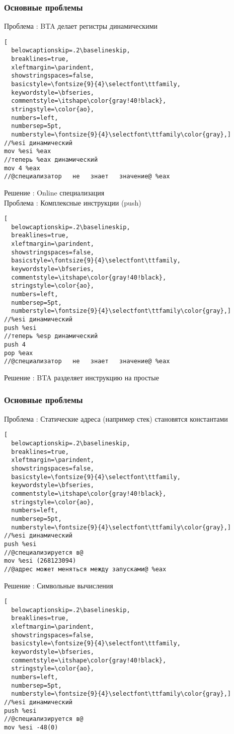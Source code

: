 \documentclass[demo]{beamer}
\begin{document}
\lstset{language=C}
\begin{frame}[fragile]\frametitle{Основные проблемы}
Проблема : BTA делает регистры динамическими \\
\begin{lstlisting}[
  belowcaptionskip=.2\baselineskip,
  breaklines=true,
  xleftmargin=\parindent,
  showstringspaces=false,
  basicstyle=\fontsize{9}{4}\selectfont\ttfamily,
  keywordstyle=\bfseries,
  commentstyle=\itshape\color{gray!40!black},
  stringstyle=\color{ao},
  numbers=left,
  numbersep=5pt,
  numberstyle=\fontsize{9}{4}\selectfont\ttfamily\color{gray},]
//%esi динамический
mov %esi %eax
//теперь %eax динамический
mov 4 %eax
//@специализатор   не   знает   значение@ %eax
\end{lstlisting}
Решение : Online специализация \\
\vfill
Проблема : Комплексные инструкции (push)\\\begin{lstlisting}[
  belowcaptionskip=.2\baselineskip,
  breaklines=true,
  xleftmargin=\parindent,
  showstringspaces=false,
  basicstyle=\fontsize{9}{4}\selectfont\ttfamily,
  keywordstyle=\bfseries,
  commentstyle=\itshape\color{gray!40!black},
  stringstyle=\color{ao},
  numbers=left,
  numbersep=5pt,
  numberstyle=\fontsize{9}{4}\selectfont\ttfamily\color{gray},]
//%esi динамический
push %esi
//теперь %esp динамический
push 4
pop %eax
//@специализатор   не   знает   значение@ %eax
\end{lstlisting}
Решение : BTA разделяет инструкцию на простые\\
\end{frame}


\lstset{language=C}
\begin{frame}[fragile]\frametitle{Основные проблемы}
Проблема : Статические адреса (например стек) становятся константами \\
\begin{lstlisting}[
  belowcaptionskip=.2\baselineskip,
  breaklines=true,
  xleftmargin=\parindent,
  showstringspaces=false,
  basicstyle=\fontsize{9}{4}\selectfont\ttfamily,
  keywordstyle=\bfseries,
  commentstyle=\itshape\color{gray!40!black},
  stringstyle=\color{ao},
  numbers=left,
  numbersep=5pt,
  numberstyle=\fontsize{9}{4}\selectfont\ttfamily\color{gray},]
//%esi динамический
push %esi
//@специализируется в@
mov %esi (268123094)
//@адрес может меняться между запусками@ %eax
\end{lstlisting}
\vfill
Решение : Символьные вычисления
\begin{lstlisting}[
  belowcaptionskip=.2\baselineskip,
  breaklines=true,
  xleftmargin=\parindent,
  showstringspaces=false,
  basicstyle=\fontsize{9}{4}\selectfont\ttfamily,
  keywordstyle=\bfseries,
  commentstyle=\itshape\color{gray!40!black},
  stringstyle=\color{ao},
  numbers=left,
  numbersep=5pt,
  numberstyle=\fontsize{9}{4}\selectfont\ttfamily\color{gray},]
//%esi динамический
push %esi
//@специализируется в@
mov %esi -48(0)
\end{lstlisting}
\end{frame}
\end{document}
